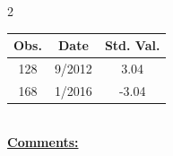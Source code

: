 
\bigskip 
\begin{multicols}{2}{ 
\begin{tabular}{ccc}
\hline  Obs.  &  Date &  Std. Val. \\ 
\hline 
                      128 &        9/2012 &          3.04 \vspace{-.12in} \\  
                      168 &        1/2016 &         -3.04 \vspace{-.12in} \\  
 \end{tabular} 
\\ 
 \columnbreak 
 \singlespacing 
 \underline{\textbf{Comments:}} \\ 
 \bigskip       

 } 
\end{multicols} 
